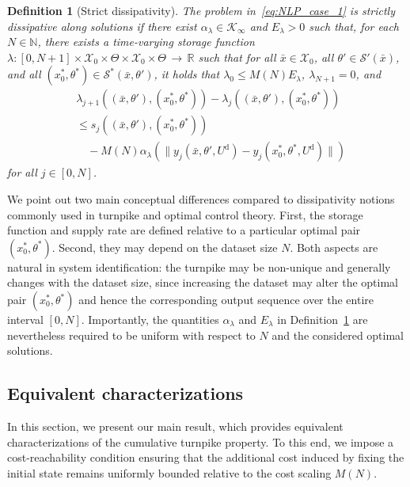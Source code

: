 \documentclass[a4paper,fleqn]{cas-dc}
\newtheorem{defn}{Definition}
\begin{document}
\begin{defn}[Strict dissipativity]\label{def:diss}
	The problem in~\eqref{eq:NLP_case_1} is \emph{strictly dissipative} along solutions if there exist $\alpha_\lambda\in\mathcal{K}_\infty$ and $E_\lambda>0$ such that, for each $N\in\mathbb{N}$, there exists a time-varying storage function $\lambda{:}[0,N+1]\times\mathcal{X}_0\times\Theta\times\mathcal{X}_0\times\Theta{\,\rightarrow\,}\mathbb{R}$ such that for all $\bar{x}\in\mathcal{X}_0$, all $\theta'\in\mathcal{S}'(\bar{x})$, and all $(x_0^*,\theta^*)\in \mathcal{S}^*(\bar{x},\theta')$, it holds that $\lambda_0\leq M(N) E_\lambda$, $\lambda_{N+1}=0$, and
	\begin{align}
		&\lambda_{j+1}((\bar{x},\theta'),(x_0^*,\theta^*)) - \lambda_j((\bar{x},\theta'),(x_0^*,\theta^*)) \nonumber \\
		&\leq s_j((\bar{x},\theta'),(x_0^*,\theta^*))   \label{eq:diss_dissip}\\
		&\quad - M(N)\alpha_\lambda(\|y_j(\bar{x},\theta',U^\mathrm{d})- y_j(x_0^*,\theta^*,U^\mathrm{d})\|)  \nonumber
	\end{align}
	for all $j\in[0,N]$.
\end{defn}

We point out two main conceptual differences compared to dissipativity notions commonly used in turnpike and optimal control theory.
First, the storage function and supply rate are defined relative to a particular optimal pair $(x_0^*,\theta^*)$. Second, they may depend on the dataset size $N$.
Both aspects are natural in system identification: the turnpike may be non-unique and generally changes with the dataset size, since increasing the dataset may alter the optimal pair $(x^*_0,\theta^*)$ and hence the corresponding output sequence over the entire interval $[0,N]$. Importantly, the quantities $\alpha_\lambda$ and $E_\lambda$ in Definition~\ref{def:diss} are nevertheless required to be uniform with respect to $N$ and the considered optimal solutions.

\subsection{Equivalent characterizations}\label{sec:main_result}

In this section, we present our main result, which provides equivalent characterizations of the cumulative turnpike property. To this end, we impose a cost-reachability condition ensuring that the additional cost induced by fixing the initial state remains uniformly bounded relative to the cost scaling $M(N)$.
\end{document}
